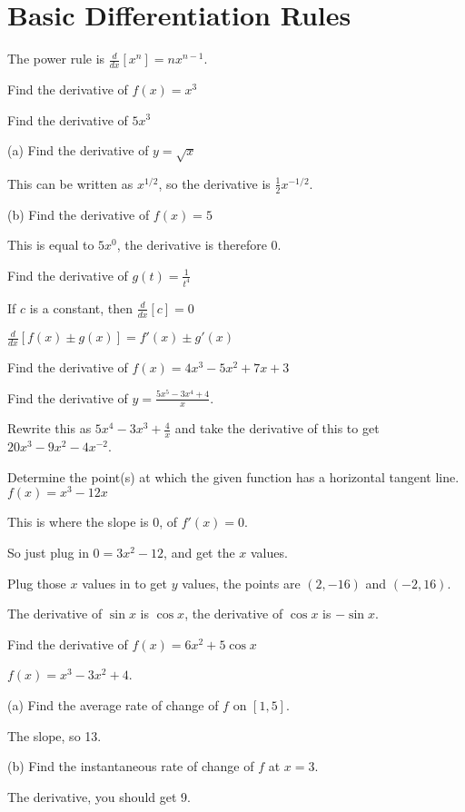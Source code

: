 \documentclass[../bccalc.tex]{subfiles}
\begin{document}
\section{Basic Differentiation Rules}
The power rule is $\frac{d}{dx}[x^n]=nx^{n-1}$.

\ex Find the derivative of $f(x)=x^3$

\ex Find the derivative of $5x^3$

\begin{example}
    (a) Find the derivative of $y=\sqrt{x}$

    This can be written as $x^{1/2}$, so the derivative is $\frac{1}{2}x^{-1/2}$.

    (b) Find the derivative of $f(x)=5$

    This is equal to $5x^0$, the derivative is therefore 0.
\end{example}

\ex Find the derivative of $g(t)=\frac{1}{t^4}$

If $c$ is a constant, then $\frac{d}{dx}[c]=0$

$\frac{d}{dx}[f(x)\pm g(x)]=f'(x)\pm g'(x)$

\ex Find the derivative of $f(x)=4x^3-5x^2+7x+3$

\begin{example}
    Find the derivative of $y=\frac{5x^5-3x^4+4}{x}$.

    Rewrite this as $5x^4-3x^3+\frac{4}{x}$ and take the derivative of this to get $20x^3-9x^2-4x^{-2}$.
\end{example}

\begin{example}
    Determine the point(s) at which the given function has a horizontal tangent line. $f(x)=x^3-12x$

    This is where the slope is 0, of $f'(x)=0$.

    So just plug in $0=3x^2-12$, and get the $x$ values.

    Plug those $x$ values in to get $y$ values, the points are $(2,-16)$ and $(-2,16)$.
\end{example}

The derivative of $\sin x$ is $\cos x$, the derivative of $\cos x$ is $-\sin x$.

\ex Find the derivative of $f(x)=6x^2+5\cos x$

\begin{example}
    $f(x)=x^3-3x^2+4$.

    (a) Find the average rate of change of $f$ on $[1,5]$.

    The slope, so 13.

    (b) Find the instantaneous rate of change of $f$ at $x=3$.

    The derivative, you should get 9.
\end{example}
\end{document}
